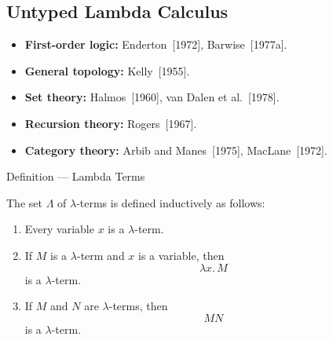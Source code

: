 




\subsection*{Untyped Lambda Calculus}
\begin{tcolorbox}[title={Background References}]
\begin{itemize}
  \item \textbf{First-order logic:} Enderton~[1972], Barwise~[1977a].
  \item \textbf{General topology:} Kelly~[1955].
  \item \textbf{Set theory:} Halmos~[1960], van Dalen et al.~[1978].
  \item \textbf{Recursion theory:} Rogers~[1967].
  \item \textbf{Category theory:} Arbib and Manes~[1975], MacLane~[1972].
\end{itemize}
\end{tcolorbox}





\begin{definitionbox}{Definition --- Lambda Terms}
\begin{definition}
\label{def:lambda-terms}
The set $\Lambda$ of $\lambda$-terms is defined inductively as follows:

\begin{enumerate}
    \item Every variable $x$ is a $\lambda$-term.
    \item If $M$ is a $\lambda$-term and $x$ is a variable, then
    \[
    \lambda x.\,M
    \]
    is a $\lambda$-term.
    \item If $M$ and $N$ are $\lambda$-terms, then
    \[
    MN
    \]
    is a $\lambda$-term.
\end{enumerate}
\end{definition}

\NoLocalDependencies
\end{definitionbox}

